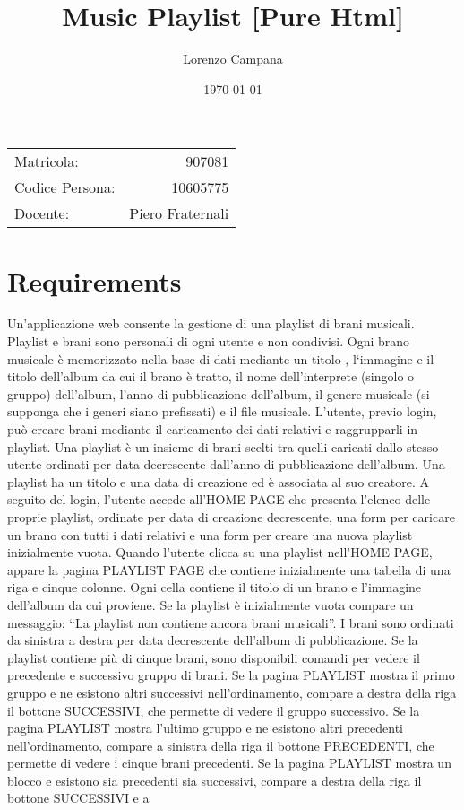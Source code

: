 \documentclass{article}
\title{Music Playlist [Pure Html]} %
\author{Lorenzo Campana} %
\date{\today}
\begin{document}
\maketitle 
\begin{center}
\begin{tabular}{l r}
Matricola: & 907081\\ %
Codice Persona: & 10605775\\
Docente: & Piero Fraternali
\end{tabular}
\end{center}


\section{Requirements}
Un’applicazione web consente la gestione di una playlist di brani musicali. Playlist e brani sono personali di ogni utente e non condivisi. Ogni brano musicale è memorizzato nella base di dati mediante un titolo , l‘immagine e il titolo dell’album da cui il brano è tratto, il nome dell’interprete (singolo o gruppo) dell’album,  l’anno di pubblicazione dell’album, il genere musicale (si supponga che i generi siano prefissati) e il file musicale. L’utente, previo login, può creare brani mediante il caricamento dei dati relativi e raggrupparli in playlist.  Una playlist è un insieme di brani scelti tra quelli caricati dallo stesso utente ordinati per data decrescente dall’anno di pubblicazione dell’album. Una playlist ha un titolo e una data di creazione ed è associata al suo creatore.  A seguito del login, l’utente accede all’HOME PAGE che presenta l’elenco delle proprie playlist, ordinate per data di creazione decrescente, una form per caricare un brano con tutti i dati relativi e una form per creare una nuova playlist inizialmente vuota. Quando l’utente clicca su una playlist nell’HOME PAGE, appare la pagina PLAYLIST PAGE che contiene inizialmente una tabella di una riga e cinque colonne. Ogni cella contiene  il titolo di un brano e l’immagine dell’album da cui proviene. Se la playlist è inizialmente vuota compare un messaggio: “La playlist non contiene ancora brani musicali”. I brani sono ordinati da sinistra a destra per data decrescente dell’album di pubblicazione. Se la playlist contiene più di cinque brani, sono disponibili comandi per vedere il precedente e successivo gruppo di brani. Se la pagina PLAYLIST mostra il primo gruppo e ne esistono altri successivi nell’ordinamento, compare a destra della riga il bottone SUCCESSIVI, che permette di vedere il gruppo successivo. Se la pagina PLAYLIST mostra l’ultimo gruppo e ne esistono altri precedenti nell’ordinamento, compare a sinistra della riga il bottone PRECEDENTI, che permette di vedere i cinque brani precedenti. Se la pagina PLAYLIST mostra un blocco e esistono sia precedenti sia successivi, compare a destra della riga il bottone SUCCESSIVI e a 
\end{document}
